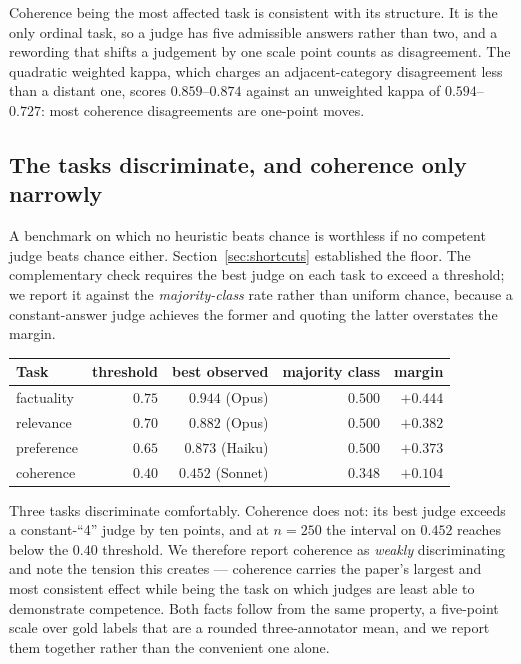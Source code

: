 Coherence being the most affected task is consistent with its structure. It is
the only ordinal task, so a judge has five admissible answers rather than two,
and a rewording that shifts a judgement by one scale point counts as
disagreement. The quadratic weighted kappa, which charges an adjacent-category
disagreement less than a distant one, scores $0.859$--$0.874$ against an
unweighted kappa of $0.594$--$0.727$: most coherence disagreements are one-point
moves.

\subsection{The tasks discriminate, and coherence only narrowly}
\label{sec:results-discriminate}

A benchmark on which no heuristic beats chance is worthless if no competent judge
beats chance either. Section~\ref{sec:shortcuts} established the floor. The
complementary check requires the best judge on each task to exceed a threshold;
we report it against the \emph{majority-class} rate rather than uniform chance,
because a constant-answer judge achieves the former and quoting the latter
overstates the margin.

\begin{center}
\begin{tabular}{lrrrr}
\toprule
Task & threshold & best observed & majority class & margin \\
\midrule
factuality & $0.75$ & $0.944$ (Opus)   & $0.500$ & $+0.444$ \\
relevance  & $0.70$ & $0.882$ (Opus)   & $0.500$ & $+0.382$ \\
preference & $0.65$ & $0.873$ (Haiku)  & $0.500$ & $+0.373$ \\
coherence  & $0.40$ & $0.452$ (Sonnet) & $0.348$ & $+0.104$ \\
\bottomrule
\end{tabular}
\end{center}

Three tasks discriminate comfortably. Coherence does not: its best judge exceeds
a constant-``4'' judge by ten points, and at $n=250$ the interval on $0.452$
reaches below the $0.40$ threshold. We therefore report coherence as
\emph{weakly} discriminating and note the tension this creates --- coherence
carries the paper's largest and most consistent effect while being the task on
which judges are least able to demonstrate competence. Both facts follow from
the same property, a five-point scale over gold labels that are a rounded
three-annotator mean, and we report them together rather than the convenient one
alone.

